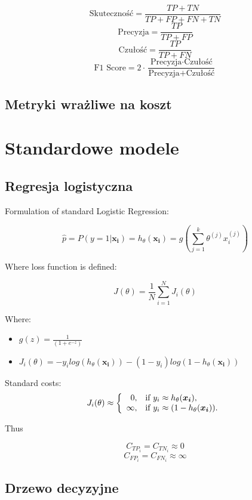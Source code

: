 \documentclass{book}
\begin{document}
$$ \text{Skuteczność} = \frac{TP + TN}{TP + FP + FN + TN} $$
$$ \text{Precyzja} = \frac{TP}{TP + FP} $$
$$ \text{Czułość}= \frac{TP}{TP + FN} $$
$$ \text{F1 Score} = 2 \cdot \frac{\text{Precyzja} \cdot \text{Czułość}}{\text{Precyzja} + \text{Czułość}} $$

\subsection{Metryki wrażliwe na koszt}

\section{Standardowe modele}

\subsection{Regresja logistyczna}

	Formulation of standard Logistic Regression:
	
	$$ \hat{p} = P(y=1|\boldsymbol{x_i}) = h_{\theta}(\boldsymbol{x_i}) = g\left(\sum_{j=1}^k \theta^{(j)}x_i^{(j)} \right) $$
	
	Where loss function is defined:
	
	$$ J(\theta) = \frac{1}{N} \sum_{i=1}^N J_i(\theta) $$
	
	Where:
	
	\begin{itemize}
		\item $ \displaystyle g(z) = \frac{1}{(1+e^{-z})} $
		\item $ \displaystyle J_i(\theta) = -y_i log(h_{\theta}(\boldsymbol{x_i})) - (1-y_i) log(1 - h_{\theta}(\boldsymbol{x_i})) $
	\end{itemize}{}

    Standard costs:
	$$
	J_i(\theta) \approx \left\{
	\begin{array}{rl}
	0, &\mbox{if $y_i \approx h_{\theta}(\boldsymbol{x_i})$}, \\
	\infty, &\mbox{if $y_i \approx (1 - h_{\theta}(\boldsymbol{x_i}))$}.
	\end{array}{}
	\right.
	$$
	
	Thus
	
	$$ C_{TP_i} = C_{TN_i} \approx 0 $$
	$$ C_{FP_i} = C_{FN_i} \approx \infty $$

\subsection{Drzewo decyzyjne}
\end{document}
